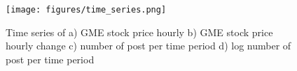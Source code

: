 \documentclass[noacm,sigconf,authorversion]{acmart}
\begin{document}
\begin{table}[b]
 \begin{center}
\end{center}
 \caption{Ten top self labeled topics or 'flairs' with the most posts}
 \label{tab:stats}
\end{table}

\begin{figure}[b]       
    \texttt{[image: figures/time\_series.png]}
    \caption{Time series of a) GME stock price hourly b) GME stock price hourly change c) number of post per time period d) log number of post per time period}
    \label{fig:posts_time}
\end{figure}
\end{document}
